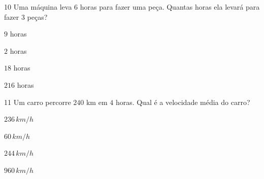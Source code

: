 
\num{10} Uma máquina leva $6$ horas para fazer uma peça. Quantas horas ela
levará para fazer $3$ peças?

\begin{escolha}
\item $9$ horas
\item $2$ horas
\item $18$ horas
\item $216$ horas
\end{escolha}



\num{11} Um carro percorre $240$ km em $4$ horas. Qual é a velocidade média do
carro?

\begin{escolha}
\item $236\,km/h$
\item $60\,km/h$
\item $244\,km/h$
\item $960\,km/h$
\end{escolha}



